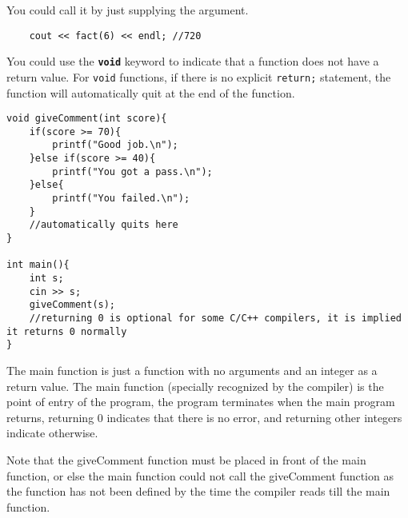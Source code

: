You could call it by just supplying the argument.

\begin{lstlisting}
    cout << fact(6) << endl; //720
\end{lstlisting}

You could use the \texttt{\textbf{void}} keyword to indicate that a function does not have a return value. For \texttt{void} functions, if there is no explicit \texttt{return;} statement, the function will automatically quit at the end of the function. 

\begin{lstlisting}
void giveComment(int score){
    if(score >= 70){
        printf("Good job.\n");
    }else if(score >= 40){
        printf("You got a pass.\n");
    }else{
        printf("You failed.\n");
    }
    //automatically quits here
}

int main(){
    int s;
    cin >> s;
    giveComment(s);
    //returning 0 is optional for some C/C++ compilers, it is implied it returns 0 normally
}
\end{lstlisting}

The main function is just a function with no arguments and an integer as a return value. The main function (specially recognized by the compiler) is the point of entry of the program, the program terminates when the main program returns, returning 0 indicates that there is no error, and returning other integers indicate otherwise.
\vspace{6mm}

Note that the giveComment function must be placed in front of the main function, or else the main function could not call the giveComment function as the function has not been defined by the time the compiler reads till the main function. 